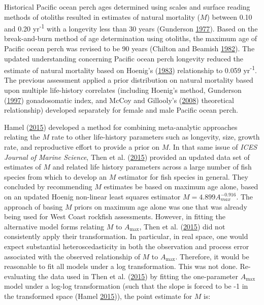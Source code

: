 \documentclass[12pt,]{article}
\begin{document}
Historical Pacific ocean perch ages determined using scales and surface
reading methods of otoliths resulted in estimates of natural mortality
(\(M\)) between 0.10 and 0.20 yr\textsuperscript{-1} with a longevity
less than 30 years (Gunderson
\protect\hyperlink{ref-gunderson_population_1977}{1977}). Based on the
break-and-burn method of age determination using otoliths, the maximum
age of Pacific ocean perch was revised to be 90 years (Chilton and
Beamish \protect\hyperlink{ref-chilton_age_1982}{1982}). The updated
understanding concerning Pacific ocean perch longevity reduced the
estimate of natural mortality based on Hoenig's
(\protect\hyperlink{ref-hoenig_empirical_1983}{1983}) relationship to
0.059 yr\textsuperscript{-1}. The previous assessment applied a prior
distribution on natural mortality based upon multiple life-history
correlates (including Hoenig's method, Gunderson
(\protect\hyperlink{ref-gunderson_trade-off_1997}{1997}) gonadosomatic
index, and McCoy and Gillooly's
(\protect\hyperlink{ref-mccoy_predicting_2008}{2008}) theoretical
relationship) developed separately for female and male Pacific ocean
perch.

Hamel (\protect\hyperlink{ref-hamel_method_2015}{2015}) developed a
method for combining meta-analytic approaches relating the \(M\) rate to
other life-history parameters such as longevity, size, growth rate, and
reproductive effort to provide a prior on \(M\). In that same issue of
\emph{ICES Journal of Marine Science}, Then et al.
(\protect\hyperlink{ref-then_evaluating_2015}{2015}) provided an updated
data set of estimates of \(M\) and related life history parameters
across a large number of fish species from which to develop an \(M\)
estimator for fish species in general. They concluded by recommending
\(M\) estimates be based on maximum age alone, based on an updated
Hoenig non-linear least squares estimator \(M=4.899A^{-0.916}_{max}\).
The approach of basing \(M\) priors on maximum age alone was one that
was already being used for West Coast rockfish assessments. However, in
fitting the alternative model forms relating \(M\) to
\(A_{\text{max}}\), Then et al.
(\protect\hyperlink{ref-then_evaluating_2015}{2015}) did not
consistently apply their transformation. In particular, in real space,
one would expect substantial heteroscedasticity in both the observation
and process error associated with the observed relationship of \(M\) to
\(A_{\text{max}}\). Therefore, it would be reasonable to fit all models
under a log transformation. This was not done. Re-evaluating the data
used in Then et al. (\protect\hyperlink{ref-then_evaluating_2015}{2015})
by fitting the one-parameter \(A_{\text{max}}\) model under a log-log
transformation (such that the slope is forced to be -1 in the
transformed space (Hamel
\protect\hyperlink{ref-hamel_method_2015}{2015})), the point estimate
for \(M\) is:
\end{document}
